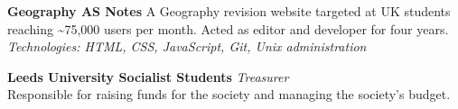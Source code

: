 \documentclass[11pt]{article}
\begin{document}
\medskip
\textbf{Geography AS Notes}  \newline
A Geography revision website targeted at UK students reaching
\textasciitilde{}75,000 users per month. Acted as editor and developer for
four years. \\
\emph{Technologies: HTML, CSS, JavaScript, Git, Unix administration}

\bigskip

%
\textbf{Leeds University Socialist Students}  \newline
\emph{Treasurer}\\
Responsible for raising funds for the society and managing the society's budget.
\end{document}
